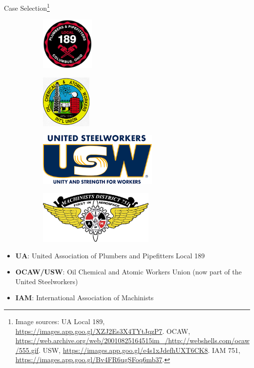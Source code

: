 \documentclass{beamer}
\begin{document}
\begin{frame}{Case Selection\footnote{Image sources: UA Local 189, \url{https://images.app.goo.gl/XZJ2Es3X4TYtJqzP7}. OCAW, \url{https://web.archive.org/web/20010825164515im_/http://webshells.com/ocaw/555.gif}. USW, \url{https://images.app.goo.gl/e4s1xJdefhUXT6CK8}. IAM 751, \url{https://images.app.goo.gl/Bv4FR6ugSFoq6mb37}.}}
\begin{figure}
\begin{subfigure}[t]{0.2\linewidth}
  \includegraphics[height=75pt]{UA_189}
\end{subfigure}%
\begin{subfigure}[t]{0.2\linewidth}
  \includegraphics[height=75pt]{OCAW}
\end{subfigure}
\begin{subfigure}[t]{0.2\linewidth}
  \includegraphics[height=75pt]{USW}
\end{subfigure}%
\begin{subfigure}[t]{0.2\linewidth}
  \includegraphics[height=75pt]{IAM_751}
\end{subfigure}
\end{figure}

\vfill

	\begin{itemize}
			\item \textbf{UA}: United Association of Plumbers and Pipefitters Local 189
			\item \textbf{OCAW/USW}: Oil Chemical and Atomic Workers Union (now part of the United Steelworkers)
			\item \textbf{IAM}: International Association of Machinists
	\end{itemize}
\end{frame}
\end{document}
